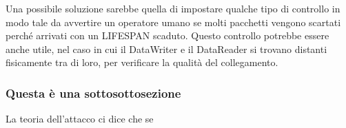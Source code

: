 Una possibile soluzione sarebbe quella di impostare qualche tipo di controllo
in modo tale da avvertire un operatore umano se molti pacchetti vengono
scartati perché arrivati con un LIFESPAN scaduto. Questo controllo potrebbe
essere anche utile, nel caso in cui il DataWriter e il DataReader si trovano
distanti fisicamente tra di loro, per verificare la qualità del collegamento.








\subsubsection{Questa è una sottosottosezione}
La teoria dell'attacco ci dice che se 


\setlength{\arrayrulewidth}{1.0pt} %


